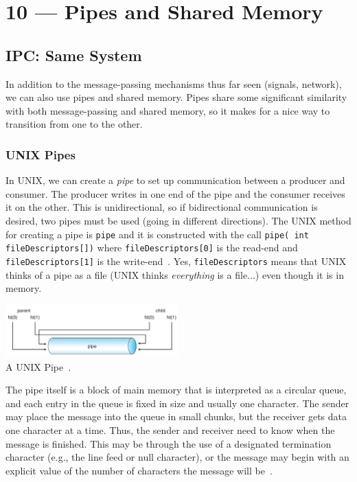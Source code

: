 \documentclass[a4paper]{report}
\begin{document}
\chapter*{10 --- Pipes and Shared Memory}


\section*{IPC: Same System}

In addition to the message-passing mechanisms thus far seen (signals, network), we can also use pipes and shared memory. Pipes share some significant similarity with both message-passing and shared memory, so it makes for a nice way to transition from one to the other.

\subsection*{UNIX Pipes}

In UNIX, we can create a \textit{pipe} to set up communication between a producer and consumer. The producer writes in one end of the pipe and the consumer receives it on the other. This is unidirectional, so if bidirectional communication is desired, two pipes must be used (going in different directions). The UNIX method for creating a pipe is \texttt{pipe} and it is constructed with the call \texttt{pipe( int fileDescriptors[])} where \texttt{fileDescriptors[0]} is the read-end and \texttt{fileDescriptors[1]} is the write-end~\cite{osc}. Yes, \texttt{fileDescriptors} means that UNIX thinks of a pipe as a file (UNIX thinks \textit{everything} is a file...) even though it is in memory.

\begin{center}
	\includegraphics[width=0.5\textwidth]{images/unix-pipe.png}\\
	A UNIX Pipe~\cite{osc}.
\end{center}

The pipe itself is a block of main memory that is interpreted as a circular queue, and each entry in the queue is fixed in size and usually one character. The sender may place the message into the queue in small chunks, but the receiver gets data one character at a time. Thus, the sender and receiver need to know when the message is finished. This may be through the use of a designated termination character (e.g., the line feed or null character), or the message may begin with an explicit value of the number of characters the message will be~\cite{mte241}.
\end{document}
